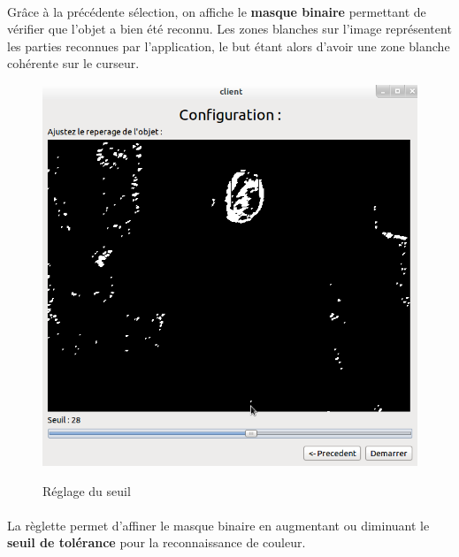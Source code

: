 \documentclass{report}
\begin{document}
				\paragraph{}
				Grâce à la précédente sélection, on affiche le \textbf{masque binaire} permettant de vérifier que l'objet a bien été reconnu. Les zones blanches sur l'image représentent les parties reconnues par l'application, le but étant alors d'avoir une zone blanche cohérente sur le curseur.
				\begin{figure}[!h]
						\centering
						\includegraphics[scale=0.35]{../images/Capture2.png}\\
						\caption{Réglage du seuil}
						\label{Réglage du seuil}
				\end{figure}
				\paragraph{}
				La règlette permet d'affiner le masque binaire en augmentant ou diminuant le \textbf{seuil de tolérance} pour la reconnaissance de couleur.
\end{document}
